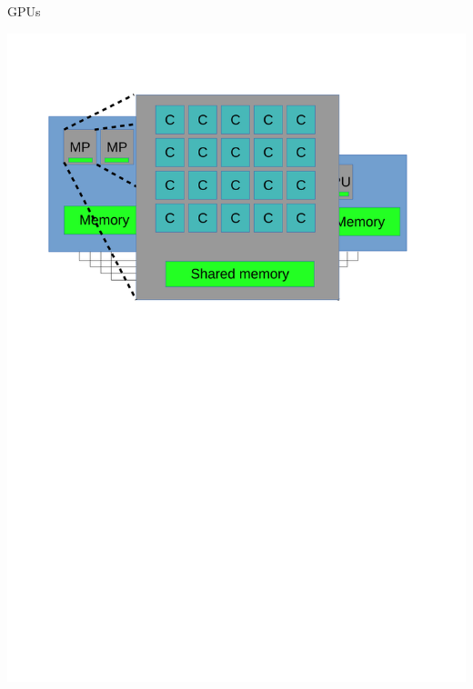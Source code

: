 \documentclass[xcolor=dvipsnames]{beamer}
\begin{document}
\begin{frame}{GPUs} 

\includegraphics[width=\linewidth]{GPU2.pdf}


\end{frame} 


%
\end{document}
